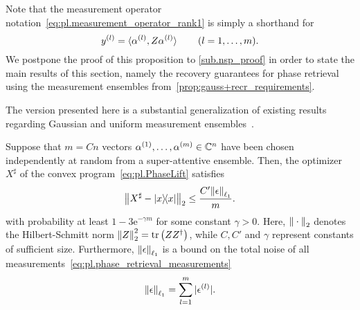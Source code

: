 Note that the measurement operator notation~\eqref{eq:pl.measurement_operator_rank1} is simply a shorthand for
\[
  y^{(l)} = \braket{\alpha^{(l)}, Z\alpha^{(l)}} \quad\quad (l=1,\ldots,m).
\]
We postpone the proof of this proposition to \cref{sub.nsp_proof} in order to state the main results of this section, namely the recovery guarantees for phase retrieval using the measurement ensembles from~\cref{prop:gauss+recr_requirements}.

The version presented here is a substantial generalization of existing results regarding Gaussian and uniform measurement ensembles~\cite{Candes_2012_Solving,Demanet_2014_Stable}.

\begin{theorem}%
  \label{thm:pl.phaselift_noisy}
  Suppose that $m = Cn$ vectors $\alpha^{(1)},\ldots,\alpha^{(m)} \in \mathbb{C}^n$ have been chosen independently at random from a super-attentive ensemble.
  Then, the optimizer $X^\sharp$ of the convex program~\eqref{eq:pl.PhaseLift} satisfies
  \[
    \Fnorm{{X}^\sharp - \ketbra{x}} \leq \frac{C'  \norm{\epsilon}_{\ell_1}}{m}.
    \label{eq:pl.noisy_recovery_bound}
  \]
  with probability at least $1 - 3\mathrm{e}^{-\gamma m}$ for some constant $\gamma > 0$.
  Here, ${\Vert\cdot\Vert}_{2}$ denotes the Hilbert-Schmitt norm ${\Vert Z\Vert}_{2}^2 = \operatorname{tr} \left( {Z} {Z}^\dagger \right)$, while $C,C'$ and $\gamma$ represent constants of sufficient size.
  Furthermore, ${\Vert\epsilon\Vert}_{\ell_1}$ is a bound on the total noise of all measurements~\eqref{eq:pl.phase_retrieval_measurements}
  \[
    {\Vert\epsilon\Vert}_{\ell_1} = \sum_{l=1}^m {\vert\epsilon^{(l)}\vert}.
    \label{eq:pl.phaselift_noisy.noise_bound}
  \]
\end{theorem}

